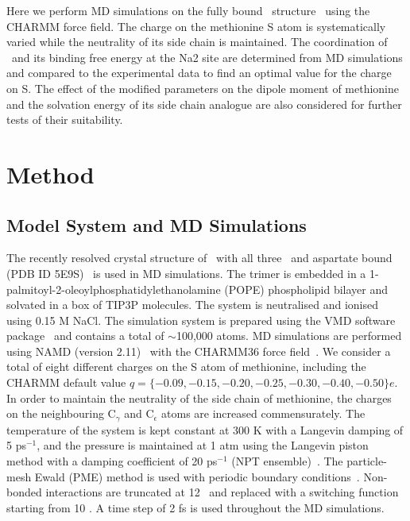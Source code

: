 Here we perform MD simulations on the fully bound \GltTk\ structure~\cite{Guskov2016} using the 
CHARMM force field. The charge on the methionine S atom is systematically varied while the neutrality 
of its side chain is maintained. The coordination of \Na\ and its binding free energy at the Na2 site 
are determined from MD simulations and compared to the experimental data to find an optimal value for 
the charge on S. The effect of the modified parameters on the dipole moment of methionine and the 
solvation energy of its side chain analogue are also considered for further tests of their suitability.

\section{Method}
\label{na2:theory}
\subsection{Model System and MD Simulations}
The recently resolved crystal structure of \GltTk\ with all three \Na\ and aspartate bound 
(PDB ID 5E9S)~\cite{Guskov2016} is used in MD simulations. The trimer is embedded in a 
1-palmitoyl-2-oleoylphosphatidylethanolamine (POPE) phospholipid bilayer and solvated in a box of 
TIP3P molecules. The system is neutralised and ionised using 0.15 M NaCl. The simulation system is 
prepared using the VMD software package~\cite{Humphrey1996} and contains a total of $\sim$100,000 atoms. 
MD simulations 
are performed using NAMD (version 2.11)~\cite{Phillips2005} with the CHARMM36 force 
field~\cite{Brooks2009}. We consider a total of eight different charges on the S atom of methionine, 
including the CHARMM default value $q=\{-0.09,-0.15,-0.20,-0.25,-0.30,-0.40,-0.50\}e$. In order to 
maintain the neutrality of the side chain of methionine, the charges on the neighbouring C$_{\gamma}$ 
and C$_{\epsilon}$ atoms are increased commensurately. The temperature of the system is kept 
constant at 300 K with a Langevin damping of 5 ps$^{-1}$, and the pressure is maintained at 1 atm 
using the Langevin piston method with a damping coefficient of 20 ps$^{-1}$ (NPT 
ensemble)~\cite{Feller1995}. The particle-mesh Ewald (PME) method is used with periodic boundary 
conditions~\cite{Darden1993}. Non-bonded interactions are truncated at 12 \angs\ and replaced 
with a switching function starting from 10 \angs. A time step of 2 fs is used throughout the MD 
simulations.

